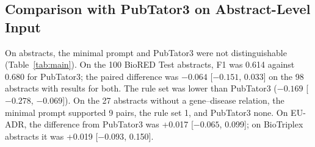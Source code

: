 \documentclass[preprint,10pt,letterpaper]{elsarticle}
\begin{document}
\begin{table}[!htbp]
\centering\footnotesize
\caption{\textbf{This rule set lowered recall and F1; F1 differences for two guideline rule sets spanned zero on Dev.} BioRED, one-to-one scoring, strict view unless stated. Differences are paired with 95\% bootstrap intervals: minimal prompt minus rule set in the first three blocks, guideline variant minus minimal prompt in the last block (Dev only).}
\label{tab:ablation}
\end{table}

\subsection{Comparison with PubTator3 on Abstract-Level Input}
On abstracts, the minimal prompt and PubTator3 were not distinguishable (Table~\ref{tab:main}). On the 100 BioRED Test abstracts, F1 was 0.614 against 0.680 for PubTator3; the paired difference was $-0.064$ [$-0.151$, 0.033] on the 98 abstracts with results for both. The rule set was lower than PubTator3 ($-0.169$ [$-0.278$, $-0.069$]). On the 27 abstracts without a gene--disease relation, the minimal prompt supported 9 pairs, the rule set 1, and PubTator3 none. On EU-ADR, the difference from PubTator3 was +0.017 [$-0.065$, 0.099]; on BioTriplex abstracts it was +0.019 [$-0.093$, 0.150].
\end{document}
